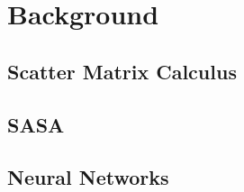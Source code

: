 \section{Background} \label{sec:background}

\subsection{Scatter Matrix Calculus} \label{sec:s_mats}

\clearpage

\subsection{SASA}\label{sec:SASA}

\clearpage

\subsection{Neural Networks} \label{sec:NN_bg}

